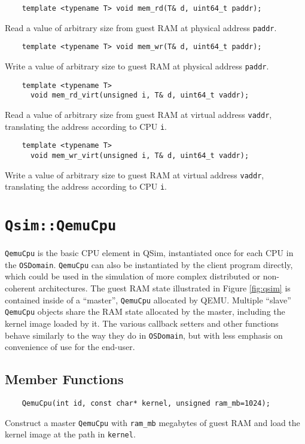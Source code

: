 \documentclass[letterpaper, 10pt]{book}
\begin{document}
\label{tf:mem_rd} \begin{verbatim}
    template <typename T> void mem_rd(T& d, uint64_t paddr);
\end{verbatim}
Read a value of arbitrary size from guest RAM at physical address 
\texttt{paddr}.

\label{tf:mem_wr} \begin{verbatim}
    template <typename T> void mem_wr(T& d, uint64_t paddr);
\end{verbatim}
Write a value of arbitrary size to guest RAM at physical address
\texttt{paddr}.

\label{tf:mem_rd_virt} \begin{verbatim}
    template <typename T> 
      void mem_rd_virt(unsigned i, T& d, uint64_t vaddr);
\end{verbatim}
Read a value of arbitrary size from guest RAM at virtual address
\texttt{vaddr}, translating the address according to CPU \texttt{i}.

\label{tf:mem_wr_virt} \begin{verbatim}
    template <typename T> 
      void mem_wr_virt(unsigned i, T& d, uint64_t vaddr);
\end{verbatim}

Write a value of arbitrary size to guest RAM at virtual address
\texttt{vaddr}, translating the address according to CPU \texttt{i}.
\newpage

\section{\texttt{Qsim::QemuCpu}} \label{class:QemuCpu}
\texttt{QemuCpu} is the basic CPU element in QSim, instantiated once for each
CPU in the \texttt{OSDomain}. \texttt{QemuCpu} can also be instantiated by the
client program directly, which could be used in the simulation of more
complex distributed or non-coherent architectures. The guest RAM state 
illustrated in Figure \ref{fig:qsim} is contained inside of a ``master'',
\texttt{QemuCpu} allocated by QEMU. Multiple ``slave'' \texttt{QemuCpu}
objects share the RAM state allocated by the master, including the kernel
image loaded by it. The various callback setters and other functions behave
similarly to the way they do in \texttt{OSDomain}, but with less emphasis on
convenience of use for the end-user.

\subsection{Member Functions}
\begin{verbatim}
    QemuCpu(int id, const char* kernel, unsigned ram_mb=1024);
\end{verbatim}
Construct a master \texttt{QemuCpu} with \texttt{ram\_mb} megabytes of guest 
RAM and load the kernel image at the path in \texttt{kernel}. 
\end{document}
